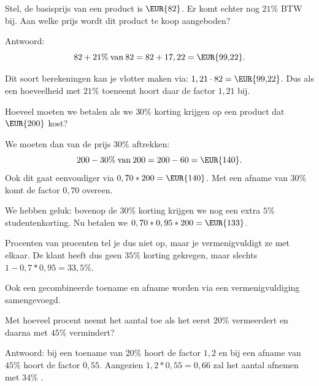 \begin{voorbeeld}
	Stel, de basisprijs van een product is $\text{\EUR{82}}$. Er komt
echter nog $21\%$ BTW bij. Aan welke prijs wordt dit product te koop
aangeboden?

Antwoord: 
\begin{equation*}
82+21\%\:\mathrm{van\:}82=82+17,22=\text{\EUR{99,22}}.
\end{equation*}

Dit soort berekeningen kan je vlotter maken via: $1,21\cdot 82=\text{\EUR{99,22}}$.
Dus als een hoeveelheid met $21\%$ toeneemt hoort daar de factor
$1,21$ bij.

\end{voorbeeld}

\begin{voorbeeld}
Hoeveel moeten we betalen als we $30\%$ korting krijgen op een product
dat $\text{\EUR{200}}$ kost? 

We moeten dan van de prijs $30\%$
aftrekken: 
\begin{equation*}
200-30\%\:\mathrm{van\:}200=200-60=\text{\EUR{140}}.
\end{equation*}
Ook dit gaat eenvoudiger via $0,70*200=\text{\EUR{140}}$. Met een afname
van $30\%$ komt de factor $0,70$ overeen.

We hebben geluk: bovenop de $30\%$ korting krijgen we nog een extra
$5\%$ studentenkorting. Nu betalen we $0,70*0,95*200=\text{\EUR{133}}$.

Procenten van procenten tel je dus niet op, maar je vermenigvuldigt
ze met elkaar. De klant heeft dus geen $35\%$ korting gekregen, maar
slechts $1-0,7*0,95=33,5\%$.

\end{voorbeeld}

Ook een gecombineerde toename en afname worden via een vermenigvuldiging
samengevoegd.

\begin{voorbeeld}
Met hoeveel procent neemt het aantal toe als het eerst $20\%$
vermeerdert en daarna met $45\%$ vermindert?

Antwoord: bij een toename van $20\%$ hoort de factor $1,2$
en bij een afname van $45\%$ hoort de factor $0,55$. Aangezien $1,2*0,55=0,66$
zal het aantal afnemen met $34\%$ .
\end{voorbeeld}




